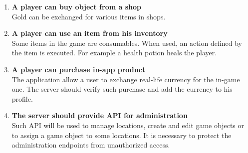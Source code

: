 \begin{enumerate}
			\item \textbf{A player can buy object from a shop} \\
			Gold can be exchanged for various items in shops.
			
			\item \textbf{A player can use an item from his inventory} \\
			Some items in the game are consumables. When used, an action defined by the item is executed. For example a health potion heals the player.
			
			\item \textbf{A player can purchase in-app product} \\
			The application allow a user to exchange real-life currency for the in-game one. The server should verify such purchase and add the currency to his profile.
			
			\item \textbf{The server should provide API for administration} \\	
			Such API will be used to manage locations, create and edit game objects or to assign a game object to some locations. It is necessary to protect the administration endpoints from unauthorized access.
			
		\end{enumerate}
		
		
